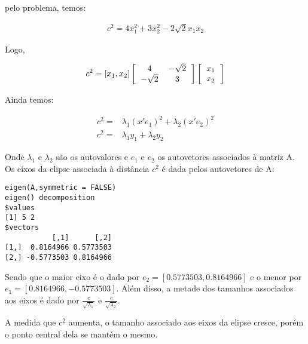\documentclass[11pt,a4paper]{book}
\begin{document}
\begin{enumerate}
		pelo problema, temos:
		
		\begin{eqnarray*}
			c^2=4x_1^2+3x_2^2-2\sqrt{2}x_1x_2
		\end{eqnarray*}
		
		Logo,
		
		\begin{eqnarray*}
			c^2=[x_1,x_2]\left[
			\begin{tabular}{c c}
			4 & $-\sqrt{2}$\\
			$-\sqrt{2}$ &$ 3$
			\end{tabular}
			\right]
			\left[
			\begin{tabular}{c}
			$x_1$\\
			$x_2$
			\end{tabular}
			\right]
		\end{eqnarray*}
		
		Ainda temos:
		
		\begin{eqnarray*}
			c^2=&\lambda_1(x'e_1)^2+\lambda_2(x'e_2)^2\\
			c^2=&\lambda_1 y_1+\lambda_2 y_2
		\end{eqnarray*}
		
		Onde $\lambda_1$ e $\lambda_2$ são os autovalores e $e_1$ e $e_2$ os autovetores associados à matriz A.
		Os eixos da elipse associada à distância $c^2$ é dada pelos autovetores de A:
		
		\begin{lstlisting}
eigen(A,symmetric = FALSE)
eigen() decomposition
$values
[1] 5 2
$vectors
           [,1]      [,2]
[1,]  0.8164966 0.5773503
[2,] -0.5773503 0.8164966
		\end{lstlisting}
		
		Sendo que o maior eixo é o dado por $e_2=[0.5773503,0.8164966]$ e o menor por $e_1=[0.8164966,-0.5773503]$.		
		Além disso, a metade dos tamanhos associados aos eixos é dado por $\frac{c}{\sqrt{\lambda_1}}$ e $\frac{c}{\sqrt{\lambda_2}}$.
		
		A medida que $c^2$ aumenta, o tamanho associado aos eixos da elipse cresce, porém o ponto central dela se mantém o mesmo.
	\end{enumerate}
\end{document}
